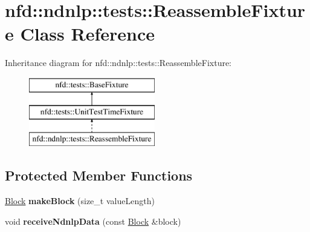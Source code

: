 \hypertarget{classnfd_1_1ndnlp_1_1tests_1_1ReassembleFixture}{}\section{nfd\+:\+:ndnlp\+:\+:tests\+:\+:Reassemble\+Fixture Class Reference}
\label{classnfd_1_1ndnlp_1_1tests_1_1ReassembleFixture}
Inheritance diagram for nfd\+:\+:ndnlp\+:\+:tests\+:\+:Reassemble\+Fixture\+:\begin{figure}[H]
\begin{center}
\leavevmode
\includegraphics[height=3.000000cm]{classnfd_1_1ndnlp_1_1tests_1_1ReassembleFixture}
\end{center}
\end{figure}
\subsection*{Protected Member Functions}
\begin{DoxyCompactItemize}
\item 
\hyperlink{classndn_1_1Block}{Block} {\bfseries make\+Block} (size\+\_\+t value\+Length)\hypertarget{classnfd_1_1ndnlp_1_1tests_1_1ReassembleFixture_a54972e0c2cad30ba2bee473ba2c92294}{}\label{classnfd_1_1ndnlp_1_1tests_1_1ReassembleFixture_a54972e0c2cad30ba2bee473ba2c92294}

\item 
void {\bfseries receive\+Ndnlp\+Data} (const \hyperlink{classndn_1_1Block}{Block} \&block)\hypertarget{classnfd_1_1ndnlp_1_1tests_1_1ReassembleFixture_af4ff97cdfaf39167d364ba35f79abdf2}{}\label{classnfd_1_1ndnlp_1_1tests_1_1ReassembleFixture_af4ff97cdfaf39167d364ba35f79abdf2}

\end{DoxyCompactItemize}
